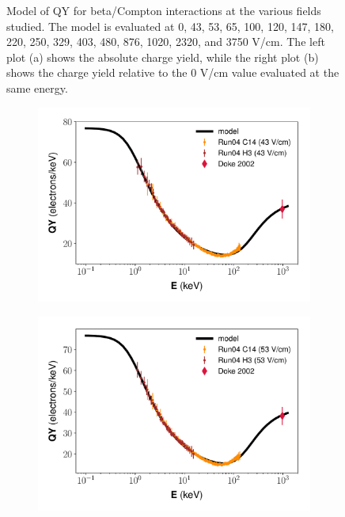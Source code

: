 \begin{figure}[!h]
\begin{subfigure}{0.5\linewidth}
\caption{}
\end{subfigure}
\caption{Model of QY for beta/Compton interactions at the various fields studied. The model is evaluated at 0, 43, 53, 65, 100, 120, 147, 180, 220, 250, 329, 403, 480, 876, 1020, 2320, and 3750 V/cm. The left plot (a) shows the absolute charge yield, while the right plot (b) shows the charge yield relative to the 0 V/cm value evaluated at the same energy. }
\label{fig:betamod_fieldvar}
\end{figure}



\begin{figure}[!h]
\centering
\begin{subfigure}{0.5\linewidth}
\includegraphics[width=\linewidth]{Figures/Yields_fit_new/NEST_fit_43Vcm_new.pdf}
\caption{}
\end{subfigure}%
\begin{subfigure}{0.5\linewidth}
\includegraphics[width=\linewidth]{Figures/Yields_fit_new/NEST_fit_53Vcm_new.pdf}

\end{subfigure}
\end{figure}
